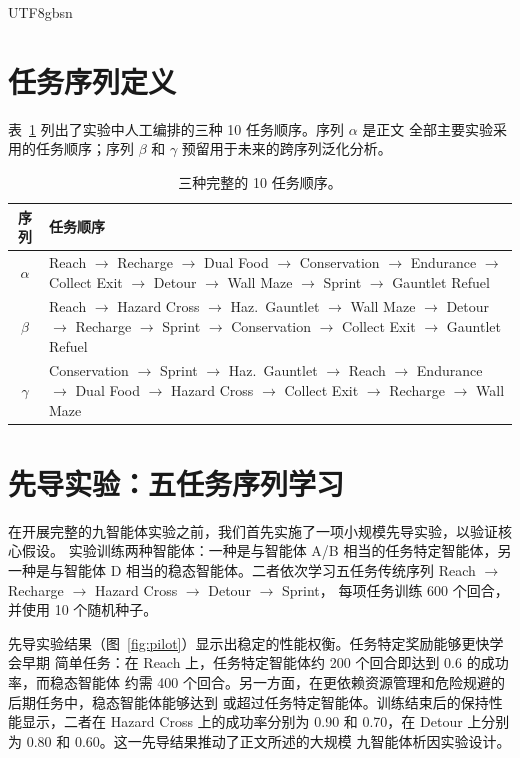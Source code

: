 \documentclass[sigplan,10pt]{acmart}
\begin{document}
\begin{CJK*}{UTF8}{gbsn}
\section{任务序列定义}
\label{app:sequences}

表~\ref{tab:sequences} 列出了实验中人工编排的三种 10 任务顺序。序列 $\alpha$ 是正文
全部主要实验采用的任务顺序；序列 $\beta$ 和 $\gamma$ 预留用于未来的跨序列泛化分析。

\begin{table}[h]
\centering
\caption{三种完整的 10 任务顺序。}
\label{tab:sequences}
\begin{tabular}{@{}cp{}@{}}
\toprule
\textbf{序列} & \textbf{任务顺序} \\
\midrule
$\alpha$ & Reach $\to$ Recharge $\to$ Dual Food $\to$ Conservation $\to$
           Endurance $\to$ Collect Exit $\to$ Detour $\to$ Wall Maze $\to$
           Sprint $\to$ Gauntlet Refuel \\
\midrule
$\beta$  & Reach $\to$ Hazard Cross $\to$ Haz.~Gauntlet $\to$ Wall Maze $\to$
           Detour $\to$ Recharge $\to$ Sprint $\to$ Conservation $\to$
           Collect Exit $\to$ Gauntlet Refuel \\
\midrule
$\gamma$ & Conservation $\to$ Sprint $\to$ Haz.~Gauntlet $\to$ Reach $\to$
           Endurance $\to$ Dual Food $\to$ Hazard Cross $\to$ Collect Exit $\to$
           Recharge $\to$ Wall Maze \\
\bottomrule
\end{tabular}
\end{table}


\section{先导实验：五任务序列学习}
\label{app:pilot}

在开展完整的九智能体实验之前，我们首先实施了一项小规模先导实验，以验证核心假设。
实验训练两种智能体：一种是与智能体 A/B 相当的任务特定智能体，另一种是与智能体 D
相当的稳态智能体。二者依次学习五任务传统序列
Reach $\to$ Recharge $\to$ Hazard Cross $\to$ Detour $\to$ Sprint，
每项任务训练 600 个回合，并使用 10 个随机种子。

先导实验结果（图~\ref{fig:pilot}）显示出稳定的性能权衡。任务特定奖励能够更快学会早期
简单任务：在 Reach 上，任务特定智能体约 200 个回合即达到 0.6 的成功率，而稳态智能体
约需 400 个回合。另一方面，在更依赖资源管理和危险规避的后期任务中，稳态智能体能够达到
或超过任务特定智能体。训练结束后的保持性能显示，二者在 Hazard Cross 上的成功率分别为
0.90 和 0.70，在 Detour 上分别为 0.80 和 0.60。这一先导结果推动了正文所述的大规模
九智能体析因实验设计。


\end{CJK*}
\end{document}
